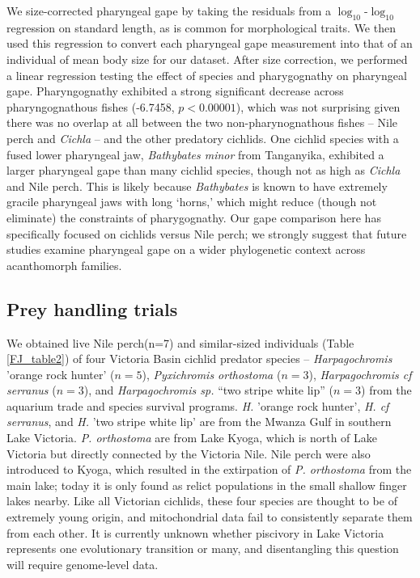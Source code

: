 We size-corrected pharyngeal gape by taking the residuals from a $\log_{10}$-$\log_{10}$ regression on standard length, as is common for morphological traits. We then used this regression to convert each pharyngeal gape measurement into that of an individual of mean body size for our dataset. After size correction, we performed a linear regression testing the effect of species and pharygognathy on pharyngeal gape. Pharyngognathy exhibited a strong significant decrease across pharyngognathous fishes (-6.7458, $p<0.00001$), which was not surprising given there was no overlap at all between the two non-pharynognathous fishes -- Nile perch and {\em Cichla} -- and the other predatory cichlids. One cichlid species with a fused lower pharyngeal jaw, {\em Bathybates minor} from Tanganyika, exhibited a larger pharyngeal gape than many cichlid species, though not as high as {\em Cichla} and Nile perch. This is likely because {\em Bathybates} is known to have extremely gracile pharyngeal jaws with long `horns,' which might reduce (though not eliminate) the constraints of pharygognathy. \cite{muschick2012convergent, hellig2010allometric} Our gape comparison here has specifically focused on cichlids versus Nile perch; we strongly suggest that future studies examine pharyngeal gape on  a wider phylogenetic context across acanthomorph families.

\subsection{Prey handling trials}

We obtained live Nile perch(n=7) and similar-sized individuals (Table \ref{FJ_table2}) of four Victoria Basin cichlid predator species -- {\em Harpagochromis} 'orange rock hunter' ($n=5$), {\em Pyxichromis orthostoma} ($n=3$), {\em Harpagochromis cf serranus} ($n=3$), and {\em Harpagochromis sp.} ``two stripe white lip'' ($n=3$) from the aquarium trade and species survival programs. {\em H.} 'orange rock hunter', {\em H. cf serranus}, and {\em H.} 'two stripe white lip' are from the Mwanza Gulf in southern Lake Victoria. {\em P. orthostoma} are from Lake Kyoga, which is north of Lake Victoria but directly connected by the Victoria Nile. Nile perch were also introduced to Kyoga, which resulted in the extirpation of {\em P. orthostoma} from the main lake; today it is only found as relict populations in the small shallow finger lakes nearby. \cite{nagl2000origin} Like all Victorian cichlids, these four species are thought to be of extremely young origin, and mitochondrial data fail to consistently separate them from each other. \cite{nagl2000origin} It is currently unknown whether piscivory in Lake Victoria represents one evolutionary transition or many, and disentangling this question will require genome-level data. \cite{wagner2013genome}

